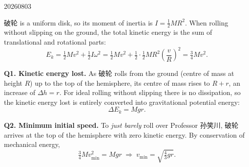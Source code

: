\begin{solution}{20260803}

破轮 is a uniform disk, so its moment of inertia is $I = \tfrac12 M R^{2}$. When rolling without slipping on the ground, the total kinetic energy is the sum of translational and rotational parts:
\[
E_k = \tfrac12 M v^{2} + \tfrac12 I \omega^{2}
    = \tfrac12 M v^{2} + \tfrac12 \cdot \tfrac12 M R^{2}\!\left(\frac{v}{R}\right)^{2}
    = \tfrac34 M v^{2}.
\]

\textbf{Q1. Kinetic energy lost.} As 破轮 rolls from the ground (centre of mass at height $R$) up to the top of the hemisphere, its centre of mass rises to $R+r$, an increase of $\Delta h = r$. For ideal rolling without slipping there is no dissipation, so the kinetic energy lost is entirely converted into gravitational potential energy:
\[
\boxed{\Delta E_k = M g r}.
\]

\textbf{Q2. Minimum initial speed.} To \emph{just barely} roll over Professor 孙笑川, 破轮 arrives at the top of the hemisphere with zero kinetic energy. By conservation of mechanical energy,
\[
\tfrac34 M v_{\min}^{2} = M g r
\;\Longrightarrow\;
\boxed{v_{\min} = \sqrt{\tfrac{4}{3} g r}}.
\]

\end{solution}


